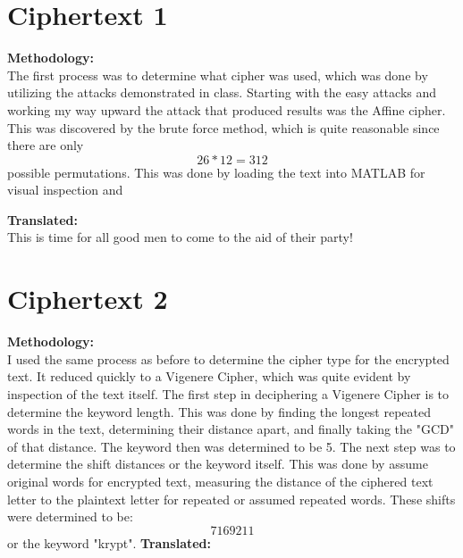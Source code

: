 \documentclass[12pt]{article}
\begin{document}
\maketitle


\section{Ciphertext 1}
\textbf{Methodology:}\\
The first process was to determine what cipher was used, which was done by utilizing the attacks demonstrated in class.  Starting with the easy attacks and working my way upward the attack that produced results was the Affine cipher.  This was discovered by the brute force method, which is quite reasonable since there are only \[ 26 * 12 = 312 \] possible permutations.  This was done by loading the text into MATLAB for visual inspection and 

\textbf{Translated:}\\
This is time for all good men to come to the aid of their party!

\section{Ciphertext 2}
\textbf{Methodology:}\\
I used the same process as before to determine the cipher type for the encrypted text.  It reduced quickly to a Vigenere Cipher, which was quite evident by inspection of the text itself.  The first step in deciphering a Vigenere Cipher is to determine the keyword length.  This was done by finding the longest repeated words in the text, determining their distance apart, and finally taking the "GCD" of that distance.  The keyword then was determined to be 5.  The next step was to determine the shift distances or the keyword itself.  This was done by assume original words for encrypted text, measuring the distance of the ciphered text letter to the plaintext letter for repeated or assumed repeated words.  These shifts were determined to be: \[7 16 9 2 11\] or the keyword "krypt".
\textbf{Translated:}\\
\end{document}
